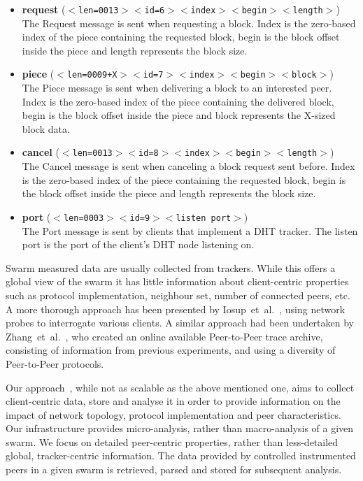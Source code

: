 \begin{itemize}
  \item \textbf{request}
  (\texttt{$<$len=0013$>$$<$id=6$>$$<$index$>$$<$begin$>$$<$length$>$}) \\
    The Request message is sent when requesting a block. Index is the
    zero-based index of the piece containing the requested block, begin is the
    block offset inside the piece and length represents the block size.

  \item \textbf{piece}
  (\texttt{$<$len=0009+X$>$$<$id=7$>$$<$index$>$$<$begin$>$$<$block$>$}) \\
    The Piece message is sent when delivering a block to an interested peer.
    Index is the zero-based index of the piece containing the delivered block,
    begin is the block offset inside the piece and block represents the
    X-sized block data.

  \item \textbf{cancel}
  (\texttt{$<$len=0013$>$$<$id=8$>$$<$index$>$$<$begin$>$$<$length$>$}) \\
    The Cancel message is sent when canceling a block request sent before.
    Index is the zero-based index of the piece containing the requested block,
    begin is the block offset inside the piece and length represents the block
    size.

  \item \textbf{port} (\texttt{$<$len=0003$>$$<$id=9$>$$<$listen port$>$}) \\
The Port message is sent by clients that implement a DHT tracker. The listen port is the port of the client's DHT node listening on.

\end{itemize}

Swarm measured data are usually collected from trackers. While this offers a
global view of the swarm it has little information about client-centric
properties such as protocol implementation, neighbour set, number of connected
peers, etc. A more thorough approach has been presented by
Iosup~et~al.~\cite{corr-overlay}, using network probes to interrogate various
clients.  A similar approach had been undertaken by
Zhang~et~al.~\cite{p2p-trace-archive}, who created an online available
Peer-to-Peer trace archive, consisting of information from previous
experiments, and using a diversity of Peer-to-Peer protocols.

Our approach~\cite{enhanced-logging}, while not as scalable as the above
mentioned one, aims to collect client-centric data, store and analyse it in
order to provide information on the impact of network topology, protocol
implementation and peer characteristics. Our infrastructure provides
micro-analysis, rather than macro-analysis of a given swarm. We focus on
detailed peer-centric properties, rather than less-detailed global,
tracker-centric information. The data provided by controlled instrumented
peers in a given swarm is retrieved, parsed and stored for subsequent
analysis.

